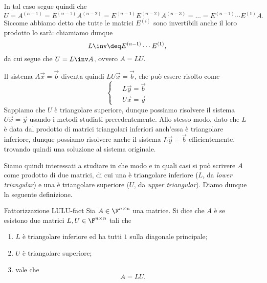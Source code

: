 In tal caso segue quindi che \[
    U = A^{(n-1)} = E^{(n-1)}A^{(n-2)} = E^{(n-1)}E^{(n-2)}A^{(n-3)} = \dots = E^{(n-1)}\cdots E^{(1)}A.
\] Siccome abbiamo detto che tutte le matrici $E^{(i)}$ sono invertibili anche il loro prodotto lo sarà: chiamiamo dunque \[
    L\inv \deq E^{(n-1)}\cdots E^{(1)},
\] da cui segue che $U = L\inv A$, ovvero $A = LU$.

Il sistema $A\vec x = \vec b$ diventa quindi $LU\vec x = \vec b$, che può essere risolto come \[
    \left\{ 
        \;
        \begin{aligned}
            &L\vec y = \vec b \\
            &U\vec x = \vec y
        \end{aligned}
    \right.
\] 
Sappiamo che $U$ è triangolare superiore, dunque possiamo risolvere il sistema $U\vec x = \vec y$ usando i metodi studiati precedentemente.
Allo stesso modo, dato che $L$ è data dal prodotto di matrici triangolari inferiori anch'essa è triangolare inferiore, dunque possiamo risolvere anche il sistema $L\vec y = \vec b$ efficientemente, trovando quindi una soluzione al sistema originale.

Siamo quindi interessati a studiare in che modo e in quali casi si può scrivere $A$ come prodotto di due matrici, di cui una è triangolare inferiore ($L$, da \emph{lower triangular}) e una è triangolare superiore ($U$, da \emph{upper triangular}). Diamo dunque la seguente definizione.

\begin{definition}
    {Fattorizzazione LU}{LU-fact}
    Sia $A \in \Mat{\F, n, n}$ una matrice. Si dice che $A$ è  se esistono due matrici $L, U \in \Mat{\F, n, n}$ tali che \begin{enumerate}[(1)]
        \item $L$ è triangolare inferiore ed ha tutti $1$ sulla diagonale principale;
        \item $U$ è triangolare superiore;
        \item vale che \[
            A = LU.
        \]
    \end{enumerate} 
\end{definition}


